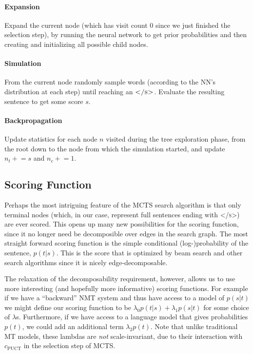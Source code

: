 \documentclass[11pt,a4paper]{article}
\newcommand{\pluseq}{\mathrel{+}=}
\begin{document}
\paragraph{Expansion}
Expand the current node (which has visit count 0 since we just finished the selection step), by running the neural network to get prior probabilities and then creating and initializing all possible child nodes.

\paragraph{Simulation}
From the current node randomly sample words (according to the NN's distribution at each step) until reaching an $\textsc{</s>}$.
Evaluate the resulting sentence to get some score $s$.

\paragraph{Backpropagation}
Update statistics for each node $n$ visited during the tree exploration phase, from the root down to the node from which the simulation started,
and update $n_t \pluseq s$ and $n_c \pluseq 1$.

\subsection{Scoring Function}
\label{sec:mcts_score}
Perhaps the most intriguing feature of the MCTS search algorithm is that only
terminal nodes (which, in our case, represent full sentences ending with
\textsc{</s>}) are ever scored. This opens up many new possibilities for the
scoring function, since it no longer need be decomposible over edges in the
search graph. The most straight forward scoring function is the simple
conditional (log-)probability of the sentence, $p(t|s)$. This is the score that
is optimized by beam search and other search algorithms since it is nicely
edge-decomposable.

The relaxation of the decomposability requirement, however, allows us to use
more interesting (and hopefully more informative) scoring functions. For
example if we have a ``backward'' NMT system and thus have access to a model of
$p(s|t)$ we might define our scoring function to be $\lambda_0 p(t|s) +
\lambda_1 p(s|t)$ for some choice of $\lambda$s. Furthermore, if we have access
to a language model that gives probabilities $p(t)$, we could add an additional
term $\lambda_2 p(t)$.
Note that unlike traditional MT models, these lambdas are \emph{not} scale-invariant,
due to their interaction with $c_\text{PUCT}$ in the selection step of MCTS.
\end{document}

